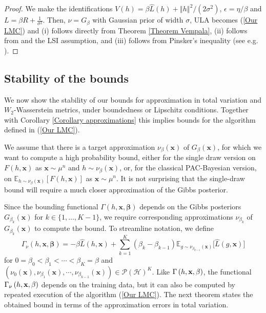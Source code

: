\documentclass{article} %
\newcommand{\massi}[2][]{\todo[color=brown!20,#1]{{\bf MP:} #2}}
\begin{document}
\begin{proof}
We make the identifications $V\left( h\right) =\beta \hat{L}\left( h\right)
+\left\Vert h\right\Vert ^{2}/\left( 2\sigma ^{2}\right) $, $\epsilon =\eta
/\beta $ and $L=\beta R+\frac{1}{\sigma ^{2}}$. Then, $\nu =G_{\beta }$ with
Gaussian prior of width $\sigma $, ULA becomes (\ref{Our LMC}) and (i)
follows directly from Theorem \ref{Theorem Vempala}, (ii) follows from \cite%
{otto2000generalization} and the LSI assumption, and (iii) follows from
Pinsker's inequality (see e.g. \cite{Boucheron13}).
\end{proof}

\subsection{Stability of the bounds\label{Section stability}}
We now show the stability of our bounds for approximation in total variation and 
$W_{2}$-Wasserstein metrics, under boundedness or Lipschitz conditions. Together with Corollary %
\ref{Corollary approximations} this implies bounds for the algorithm defined
in (\ref{Our LMC}).

We assume that there is a target approximation $\nu _{\beta }\left( \mathbf{x%
}\right) $ of $G_{\beta }\left( \mathbf{x}\right) $, for which we want to
compute a high probability bound, either for the single draw version on $%
F\left( h,\mathbf{x}\right) $ as $\mathbf{x}\sim \mu ^{n}$ and $h\sim \nu
_{\beta }\left( \mathbf{x}\right) $, or, for the classical PAC-Bayesian
version, on $\mathbb{E}_{h\sim \nu _{\beta }\left( \mathbf{x}\right) }\left[
F\left( h,\mathbf{x}\right) \right] $ as $\mathbf{x}\sim \mu ^{n}$. It is
not surprising that the single-draw bound will require a much closer
approximation of the Gibbs posterior.

Since the bounding functional $\Gamma \left( h,\mathbf{x},\bm{\beta}%
\right) $ depends on the Gibbs posteriors $G_{\beta _{k}}\left( \mathbf{x}%
\right) $ for $k\in\{ 1,\dots,K-1\}$, we require corresponding approximations $\nu
_{\beta _{k}}$ of $G_{\beta _{k}}\left( \mathbf{x}\right) $ to compute the
bound. To streamline notation, we define 
\begin{equation*}
\Gamma _{\nu }\left( h,\mathbf{x},\bm{\beta}\right) =-\beta \hat{L}%
\left( h,\mathbf{x}\right) +\sum_{k=1}^{K}\left( \beta _{k}-\beta
_{k-1}\right) \mathbb{E}_{g\sim \nu _{\beta _{k-1}}\left( \mathbf{x}\right) }%
\big[ \hat{L}(g,\mathbf{x}) \big]
\end{equation*}%
for $0=\beta _{0}<\beta _{1}<\cdots<\beta _{K}=\beta $ and $\left( \nu
_{0}\left( \mathbf{x}\right) ,\nu _{\beta _{1}}\left( \mathbf{x}\right)
,\cdots,\nu _{\beta _{k-1}}\left( \mathbf{x}\right) \right) \in \mathcal{P}%
\left( \mathcal{H}\right) ^{K}$. Like $\Gamma \left( h,\mathbf{x},\mathbf{%
\beta }\right)$, the functional $\Gamma _{\nu }\left( h,\mathbf{x},\mathbf{%
\beta }\right) $ depends on the training data, but it can also be computed
by repeated execution of the algorithm (\ref{Our LMC}). The next theorem
states the obtained bound in terms of the approximation errors in total
variation.
\end{document}
